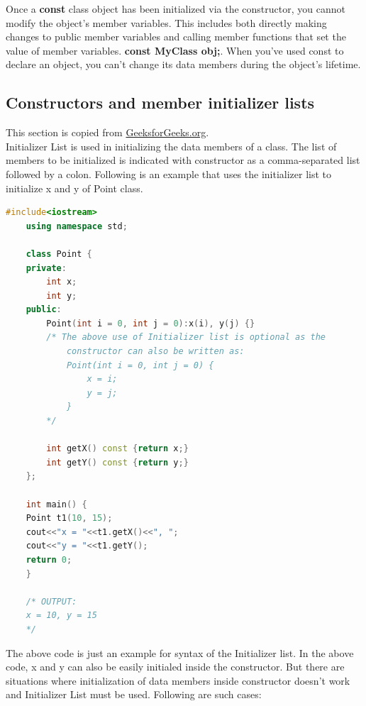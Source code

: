 \documentclass[12pt , a4paper]{article}
\newcommand{\hl}[1]{\colorbox{coolblack}{\color{cream}\textbf{#1}\color{black}}}
\begin{document}
Once a \textbf{const} class object has been initialized via the constructor, you cannot modify the object's member variables. This includes both directly making changes to public member variables and calling member functions that set the value of member variables. \hl{const MyClass obj;}. When you've used const to declare an object, you can't change its data members during the object's lifetime.


	\subsection{Constructors and member initializer lists}
This section is copied from \href{https://www.geeksforgeeks.org/when-do-we-use-initializer-list-in-c/}{GeeksforGeeks.org}.\\
Initializer List is used in initializing the data members of a class. The list of members to be initialized is indicated with constructor as a comma-separated list followed by a colon. Following is an example that uses the initializer list to initialize x and y of Point class.

	\begin{lstlisting}[language=C++]
	#include<iostream>
	using namespace std;
	
	class Point {
	private:
		int x;
		int y;
	public:
		Point(int i = 0, int j = 0):x(i), y(j) {}
		/* The above use of Initializer list is optional as the
			constructor can also be written as:
			Point(int i = 0, int j = 0) {
				x = i;
				y = j;
			}
		*/
		
		int getX() const {return x;}
		int getY() const {return y;}
	};
	
	int main() {
	Point t1(10, 15);
	cout<<"x = "<<t1.getX()<<", ";
	cout<<"y = "<<t1.getY();
	return 0;
	}
	
	/* OUTPUT:
	x = 10, y = 15
	*/


	\end{lstlisting}
The above code is just an example for syntax of the Initializer list. In the above code, x and y can also be easily initialed inside the constructor. But there are situations where initialization of data members inside constructor doesn’t work and Initializer List must be used. Following are such cases:\\
\end{document}
